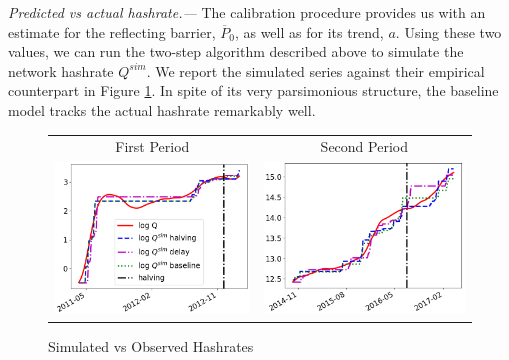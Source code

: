\documentclass[12pt, a4paper]{article}
\begin{document}
\emph{Predicted vs actual hashrate.---} The calibration procedure provides us
with an estimate for the reflecting barrier, $\overline{P}_0$, as well as
for its trend, $a$. Using these two values, we can run the two-step
algorithm described above to simulate the network hashrate $%
Q^{sim}$. We report the simulated series against their empirical
counterpart in Figure \ref{fig:hashrates_halving}. In spite of its very parsimonious
structure, the baseline model tracks the actual hashrate remarkably well.



\begin{figure}[]
\caption{Simulated vs Observed Hashrates}
\label{fig:hashrates_halving}\centering
\begin{tabular}{cc}
First Period & Second Period \\
\includegraphics[scale=0.45]{images/Q_all_1.png} & %
\includegraphics[scale=0.45]{images/Q_all_2.png}%
\end{tabular}%
\end{figure}
\end{document}
